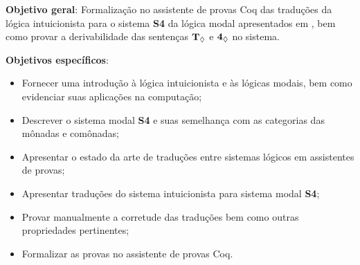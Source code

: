 \textbf{Objetivo geral}: Formalização no assistente de provas Coq das traduções da lógica intuicionista para o sistema \textbf{S4} da lógica modal apresentados em \cite{Troelstra}, bem como provar a derivabilidade das sentenças $\boldsymbol{\text{\textbf{T}}_\Diamond}$ e $\boldsymbol{\text{\textbf{4}}_\Diamond}$ no sistema.

\bigskip

\noindent
\textbf{Objetivos específicos}:
\begin{itemize}
    \item Fornecer uma introdução à lógica intuicionista e às lógicas modais, bem como evidenciar suas aplicações na computação;
    \item Descrever o sistema modal \textbf{S4} e suas semelhança com as categorias das mônadas e comônadas;
    \item Apresentar o estado da arte de traduções entre sistemas lógicos em assistentes de provas;
    \item Apresentar traduções do sistema intuicionista para sistema modal \textbf{S4};
    \item Provar manualmente a corretude das traduções bem como outras propriedades pertinentes;
    \item Formalizar as provas no assistente de provas Coq.
\end{itemize}